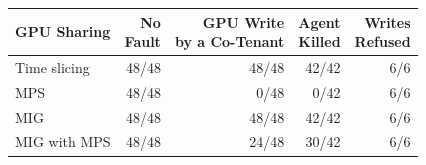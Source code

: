 \begin{tabular}{@{}lrrrr@{}}
\hline
GPU Sharing & \makecell[r]{No\\Fault} & \makecell[r]{GPU Write\\by a Co-Tenant} & \makecell[r]{Agent\\Killed} & \makecell[r]{Writes\\Refused} \\
\hline
Time slicing & 48/48 & 48/48 & 42/42 & 6/6 \\
MPS & 48/48 & 0/48 & 0/42 & 6/6 \\
MIG & 48/48 & 48/48 & 42/42 & 6/6 \\
MIG with MPS & 48/48 & 24/48 & 30/42 & 6/6 \\
\hline
\end{tabular}
